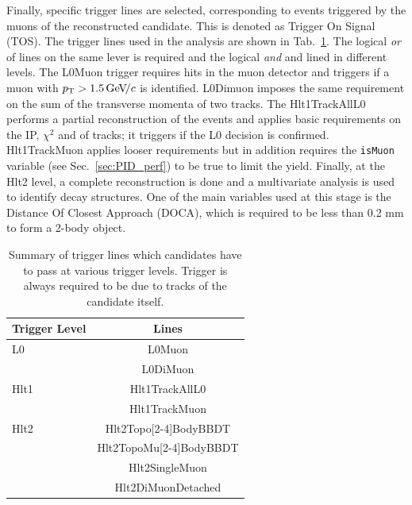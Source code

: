 Finally, specific trigger lines are selected, corresponding to events triggered by the muons
of the reconstructed candidate. This is denoted as Trigger On Signal (TOS).
The trigger lines used in the analysis are shown in Tab.~\ref{tab:Lb_triggerLines}.
The logical {\em or } of lines on the same lever is required and the logical {\em and }
and lined in different levels.
The L0Muon trigger requires hits in the muon detector and triggers if a muon with $\mbox{$p_{\rm T}$} > 1.5 {\mathrm{\,Ge\kern -0.1em V\!/}c}$ is identified.
L0Dimuon imposes the same requirement on the sum of the transverse momenta of two tracks.
The Hlt1TrackAllL0 performs a partial reconstruction of the events and applies basic requirements on the
IP, $\chi^2$ and \pt of tracks; it triggers if the L0 decision is confirmed. Hlt1TrackMuon applies looser requirements 
but in addition requires the \verb!isMuon! variable (see Sec.~\ref{sec:PID_perf}) to be true to limit the yield.
Finally, at the Hlt2 level, a complete reconstruction is done and a multivariate analysis is used to identify decay 
structures. One of the main variables used at this stage is the Distance Of Closest Approach (DOCA), which is 
required to be less than 0.2 mm to form a 2-body object.
%
\begin{table}[h]
\centering
\caption{Summary of trigger lines which candidates have to pass at various trigger levels.
Trigger is always required to be due to tracks of the candidate itself.}
\begin{tabular}{lc} \hline
Trigger Level &  Lines   \\ \hline
L0            & L0Muon  \\
                & L0DiMuon \\ \hline
Hlt1          & Hlt1TrackAllL0 \\ 
                & Hlt1TrackMuon      \\ \hline
Hlt2          & Hlt2Topo[2-4]BodyBBDT  \\
              & Hlt2TopoMu[2-4]BodyBBDT\\
              & Hlt2SingleMuon     \\
              & Hlt2DiMuonDetached \\ \hline
\end{tabular}
\label{tab:Lb_triggerLines}
\end{table}
%


